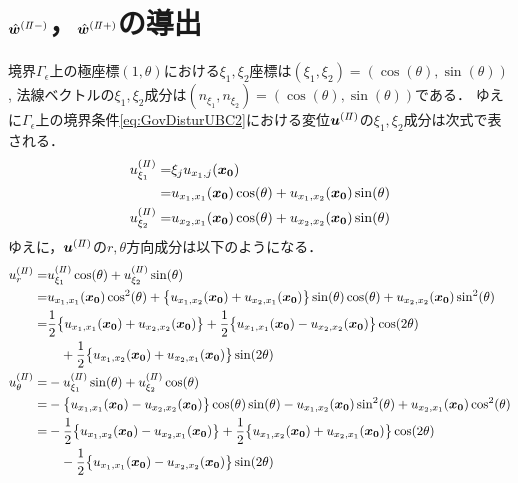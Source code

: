\section{$\hat{\bm{w}}^{(I\hspace{-.15em}I-)}$，$\hat{\bm{w}}^{(I\hspace{-.15em}I+)}$の導出}

境界$\Gamma_{\epsilon}$上の極座標$(1,\theta)$における$\xi_1,\xi_2$座標は$(\xi_1,\xi_2)=(\cos(\theta),\sin(\theta))$,
法線ベクトルの$\xi_1,\xi_2$成分は$(n_{\xi_1},n_{\xi_2})=(\cos(\theta),\sin(\theta))$である．
ゆえに$\Gamma_\epsilon$上の境界条件\eqref{eq:GovDisturUBC2}における変位$\bm{u}^{(I\hspace{-.15em}I)}$の$\xi_1,\xi_2$成分は次式で表される．
\begin{align}
	u_{\xi_1}^{(I\hspace{-.15em}I)}=&\xi_{j} u_{x_{1},j}(\bm{x_{0}})
	\nonumber
	\\
	=&u_{x_{1},x_{1}}(\bm{x_{0}})\cos(\theta)+u_{x_{1},x_{2}}(\bm{x_{0}})\sin(\theta)
	\\
	u_{\xi_2}^{(I\hspace{-.15em}I)}=
	&u_{x_{2},x_{1}}(\bm{x_{0}})\cos(\theta)+u_{x_{2},x_{2}}(\bm{x_{0}})\sin(\theta)
\end{align}
ゆえに，$\bm{u}^{(I\hspace{-.15em}I)}$の$r,\theta$方向成分は以下のようになる．
\begin{align}
	u_{r}^{(I\hspace{-.15em}I)}=
		&u_{\xi_1}^{(I\hspace{-.15em}I)}\cos(\theta)+u_{\xi_2}^{(I\hspace{-.15em}I)}\sin(\theta)
		\nonumber
		\\
		=&u_{x_{1},x_{1}}(\bm{x_{0}})\cos^2(\theta)+\bigl\{u_{x_{1},x_{2}}(\bm{x_{0}})
		+u_{x_{2},x_{1}}(\bm{x_{0}})\bigr\}\sin(\theta)\cos(\theta)
		+u_{x_{2},x_{2}}(\bm{x_{0}})\sin^2(\theta)
		\nonumber
		\\
		=&\frac{1}{2}\bigl\{u_{x_{1},x_{1}}(\bm{x_{0}})+u_{x_{2},x_{2}}(\bm{x_{0}})\bigr\}
		+\frac{1}{2}\bigl\{u_{x_{1},x_{1}}(\bm{x_{0}})-u_{x_{2},x_{2}}(\bm{x_{0}})\bigr\}\cos(2\theta)
		\nonumber
		\\
		&\quad+\frac{1}{2}\bigl\{u_{x_{1},x_{2}}(\bm{x_{0}})+u_{x_{2},x_{1}}(\bm{x_{0}})\bigr\}\sin(2\theta)
		\\
	u_{\theta}^{(I\hspace{-.15em}I)}=
		&-u_{\xi_1}^{(I\hspace{-.15em}I)}\sin(\theta)+u_{\xi_2}^{(I\hspace{-.15em}I)}\cos(\theta)
		\nonumber
		\\
		=&-\bigl\{u_{x_{1},x_{1}}(\bm{x_{0}})-u_{x_{2},x_{2}}(\bm{x_{0}})\bigr\}\cos(\theta)\sin(\theta)
		-u_{x_{1},x_{2}}(\bm{x_{0}})\sin^2(\theta)+u_{x_{2},x_{1}}(\bm{x_{0}})\cos^2(\theta)
		\nonumber
		\\
		=&-\frac{1}{2}\bigl\{u_{x_{1},x_{2}}(\bm{x_{0}})-u_{x_{2},x_{1}}(\bm{x_{0}})\bigr\}
		+\frac{1}{2}\bigl\{u_{x_{1},x_{2}}(\bm{x_{0}})+u_{x_{2},x_{1}}(\bm{x_{0}})\bigr\}\cos(2\theta)
		\nonumber
		\\
		&\quad-\frac{1}{2}\bigl\{u_{x_{1},x_{1}}(\bm{x_{0}})-u_{x_{2},x_{2}}(\bm{x_{0}})\bigr\}\sin(2\theta)
\end{align}

